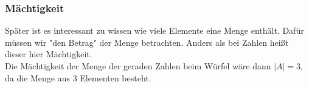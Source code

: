 			\subsubsection{Mächtigkeit}
				Später ist es interessant zu wissen wie viele Elemente eine Menge enthält.
				Dafür müssen wir "den Betrag" der Menge betrachten. Anders als bei Zahlen
				heißt dieser hier Mächtigkeit.\\
				Die Mächtigkeit der Menge der geraden Zahlen beim Würfel wäre dann
				\(|A|=3\), da die Menge aus 3 Elementen besteht.
